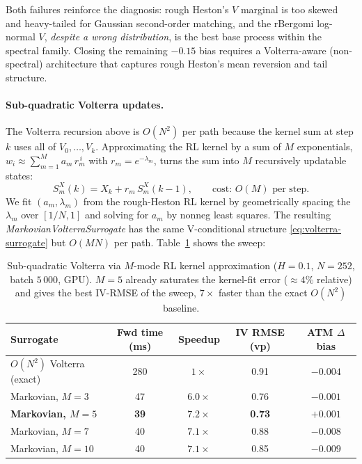 \documentclass[11pt,a4paper]{article}
\begin{document}
Both failures reinforce the diagnosis: rough Heston's $V$ marginal is
too skewed and heavy-tailed for Gaussian second-order matching, and the
rBergomi log-normal $V$, \emph{despite a wrong distribution}, is the
best base process within the spectral family. Closing the remaining
$-0.15$ bias requires a Volterra-aware (non-spectral) architecture
that captures rough Heston's mean reversion and tail structure.

\paragraph{Sub-quadratic Volterra updates.}
The Volterra recursion above is $O(N^2)$ per path because the kernel
sum at step $k$ uses all of $V_0, \ldots, V_k$. Approximating the RL
kernel by a sum of $M$ exponentials,
$w_i \approx \sum_{m=1}^{M} a_m\, r_m^{\,i}$ with $r_m = e^{-\lambda_m}$,
turns the sum into $M$ recursively updatable states:
\begin{equation}
 S_m^X(k) = X_k + r_m\, S_m^X(k-1),
 \qquad \text{cost: } O(M) \text{ per step.}
 \label{eq:markov-state}
\end{equation}
We fit $(a_m, \lambda_m)$ from the rough-Heston RL kernel by
geometrically spacing the $\lambda_m$ over $[1/N, 1]$ and solving for
$a_m$ by nonneg least squares. The resulting
\emph{MarkovianVolterraSurrogate} has the same V-conditional structure
\eqref{eq:volterra-surrogate} but $O(MN)$ per path.
Table~\ref{tab:markov-volterra} shows the sweep:

\begin{table}[h]
\centering
\caption{Sub-quadratic Volterra via $M$-mode RL kernel approximation
($H=0.1$, $N=252$, batch $5\,000$, GPU). $M = 5$ already saturates the
kernel-fit error ($\approx 4\%$ relative) and gives the best IV-RMSE
of the sweep, $7\times$ faster than the exact $O(N^2)$ baseline.}
\label{tab:markov-volterra}
\begin{tabular}{lcccc}
\toprule
Surrogate & Fwd time (ms) & Speedup & IV RMSE (vp) & ATM $\Delta$ bias \\
\midrule
$O(N^2)$ Volterra (exact)      & 280 & $1\times$  & 0.91 & $-0.004$ \\
Markovian, $M=3$           & 47 & $6.0\times$ & 0.76 & $-0.001$ \\
\textbf{Markovian, $M=5$}      & \textbf{39} & \textbf{$7.2\times$} & \textbf{0.73} & \textbf{$+0.001$} \\
Markovian, $M=7$           & 40 & $7.1\times$ & 0.88 & $-0.008$ \\
Markovian, $M=10$          & 40 & $7.1\times$ & 0.85 & $-0.009$ \\
\bottomrule
\end{tabular}
\end{table}
\end{document}
